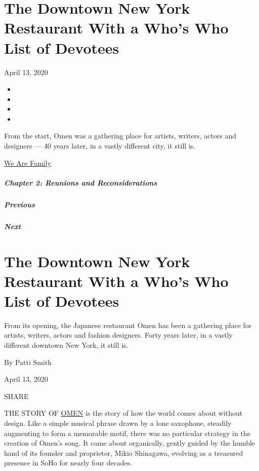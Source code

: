 \hypertarget{the-downtown-new-york-restaurant-with-a-whos-who-list-of-devotees}{%
\section{The Downtown New York Restaurant With a Who's Who List of
Devotees}\label{the-downtown-new-york-restaurant-with-a-whos-who-list-of-devotees}}

April 13, 2020

\begin{itemize}
\item
\item
\item
\item
\end{itemize}

From the start, Omen was a gathering place for artists, writers, actors
and designers --- 40 years later, in a vastly different city, it still
is.

\href{https://www.nytimes.com/interactive/2020/04/13/t-magazine/culture-issue-2020.html}{We
Are Family}

\hypertarget{chapter-2-reunions-and-reconsiderations}{%
\subparagraph{Chapter 2: Reunions and
Reconsiderations}\label{chapter-2-reunions-and-reconsiderations}}

\hypertarget{previous}{%
\subparagraph{Previous}\label{previous}}

\hypertarget{next}{%
\subparagraph{Next}\label{next}}

\hypertarget{the-downtown-new-york-restaurant-with-a-whos-who-list-of-devotees-1}{%
\section{The Downtown New York Restaurant With a Who's Who List of
Devotees}\label{the-downtown-new-york-restaurant-with-a-whos-who-list-of-devotees-1}}

From its opening, the Japanese restaurant Omen has been a gathering
place for artists, writers, actors and fashion designers. Forty years
later, in a vastly different downtown New York, it still is.

By Patti Smith

April 13, 2020

SHARE

THE STORY OF \href{http://www.omen-azen.com/}{OMEN} is the story of how
the world comes about without design. Like a simple musical phrase drawn
by a lone saxophone, steadily augmenting to form a memorable motif,
there was no particular strategy in the creation of Omen's song. It came
about organically, gently guided by the humble hand of its founder and
proprietor, Mikio Shinagawa, evolving as a treasured presence in SoHo
for nearly four decades.

